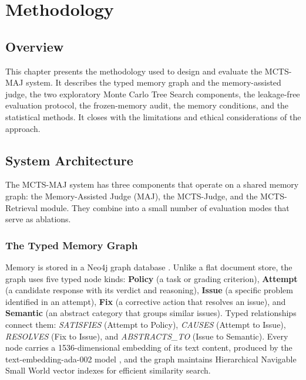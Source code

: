 \documentclass[14pt,a4paper]{extreport}
\begin{document}
\chapter{Methodology}

\section{Overview}

This chapter presents the methodology used to design and evaluate the MCTS-MAJ system. It describes the typed memory graph and the memory-assisted judge, the two exploratory Monte Carlo Tree Search components, the leakage-free evaluation protocol, the frozen-memory audit, the memory conditions, and the statistical methods. It closes with the limitations and ethical considerations of the approach.

\section{System Architecture}

The MCTS-MAJ system has three components that operate on a shared memory graph: the Memory-Assisted Judge (MAJ), the MCTS-Judge, and the MCTS-Retrieval module. They combine into a small number of evaluation modes that serve as ablations.

\subsection{The Typed Memory Graph}

Memory is stored in a Neo4j graph database \cite{neo4j2023}. Unlike a flat document store, the graph uses five typed node kinds: \textbf{Policy} (a task or grading criterion), \textbf{Attempt} (a candidate response with its verdict and reasoning), \textbf{Issue} (a specific problem identified in an attempt), \textbf{Fix} (a corrective action that resolves an issue), and \textbf{Semantic} (an abstract category that groups similar issues). Typed relationships connect them: \emph{SATISFIES} (Attempt to Policy), \emph{CAUSES} (Attempt to Issue), \emph{RESOLVES} (Fix to Issue), and \emph{ABSTRACTS\_TO} (Issue to Semantic). Every node carries a 1536-dimensional embedding of its text content, produced by the text-embedding-ada-002 model \cite{openai_embeddings2024}, and the graph maintains Hierarchical Navigable Small World vector indexes \cite{hnsw2018} for efficient similarity search.
\end{document}
